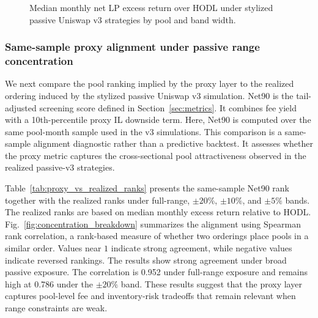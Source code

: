 \documentclass[anonymous]{lipics-v2021}
\begin{document}
{\begin{figure}[t]
\centering
{}
\caption{Median monthly net LP excess return over HODL under stylized passive Uniswap v3 strategies by pool and band width.}
\label{fig:stylized_v3_median_excess}
\end{figure}


\subsubsection{Same-sample proxy alignment under passive range concentration}
\label{subsubsec:proxy_vs_realized}

{We next compare the pool ranking implied by the proxy layer to the realized ordering induced by the stylized passive Uniswap v3 simulation. Net90 is the tail-adjusted screening score defined in Section~\ref{sec:metrics}. It combines fee yield with a 10th-percentile proxy IL downside term. Here, Net90 is computed over the same pool-month sample used in the v3 simulations. This comparison is a same-sample alignment diagnostic rather than a predictive backtest. It assesses whether the proxy metric captures the cross-sectional pool attractiveness observed in the realized passive-v3 strategies.}

{Table~\ref{tab:proxy_vs_realized_ranks} presents the same-sample Net90 rank together with the realized ranks under full-range, $\pm20\%$, $\pm10\%$, and $\pm5\%$ bands. The realized ranks are based on median monthly excess return relative to HODL. Fig.~\ref{fig:concentration_breakdown} summarizes the alignment using Spearman rank correlation, a rank-based measure of whether two orderings place pools in a similar order. 
Values near \(1\) indicate strong agreement, while negative values indicate reversed rankings.
The results show strong agreement under broad passive exposure. The correlation is 0.952 under full-range exposure and remains high at 0.786 under the $\pm20\%$ band. These results suggest that the proxy layer captures pool-level fee and inventory-risk tradeoffs that remain relevant when range constraints are weak.}

}
\end{document}
